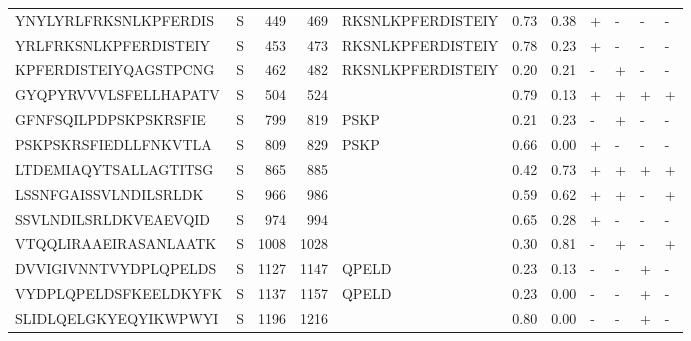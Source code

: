\begin{tabular}{llrrlrrllll}
YNYLYRLFRKSNLKPFERDIS &       S &    449 &   469 &  RKSNLKPFERDISTEIY &            0.73 &             0.38 &      + &       - &      - &       - \\
YRLFRKSNLKPFERDISTEIY &       S &    453 &   473 &  RKSNLKPFERDISTEIY &            0.78 &             0.23 &      + &       - &      - &       - \\
KPFERDISTEIYQAGSTPCNG &       S &    462 &   482 &  RKSNLKPFERDISTEIY &            0.20 &             0.21 &      - &       + &      - &       - \\
GYQPYRVVVLSFELLHAPATV &       S &    504 &   524 &                    &            0.79 &             0.13 &      + &       + &      + &       + \\
GFNFSQILPDPSKPSKRSFIE &       S &    799 &   819 &               PSKP &            0.21 &             0.23 &      - &       + &      - &       - \\
PSKPSKRSFIEDLLFNKVTLA &       S &    809 &   829 &               PSKP &            0.66 &             0.00 &      + &       - &      - &       - \\
LTDEMIAQYTSALLAGTITSG &       S &    865 &   885 &                    &            0.42 &             0.73 &      + &       + &      + &       + \\
LSSNFGAISSVLNDILSRLDK &       S &    966 &   986 &                    &            0.59 &             0.62 &      + &       + &      - &       + \\
SSVLNDILSRLDKVEAEVQID &       S &    974 &   994 &                    &            0.65 &             0.28 &      + &       - &      - &       - \\
VTQQLIRAAEIRASANLAATK &       S &   1008 &  1028 &                    &            0.30 &             0.81 &      - &       + &      - &       + \\
DVVIGIVNNTVYDPLQPELDS &       S &   1127 &  1147 &              QPELD &            0.23 &             0.13 &      - &       - &      + &       - \\
VYDPLQPELDSFKEELDKYFK &       S &   1137 &  1157 &              QPELD &            0.23 &             0.00 &      - &       - &      + &       - \\
SLIDLQELGKYEQYIKWPWYI &       S &   1196 &  1216 &                    &            0.80 &             0.00 &      - &       - &      + &       - \\
\bottomrule
\end{tabular}
